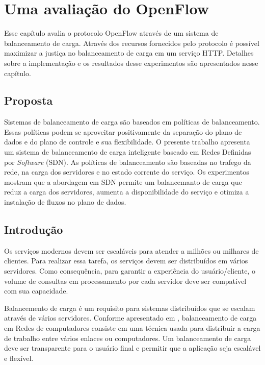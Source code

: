 \chapter{Uma avaliação do OpenFlow}

Esse capítulo avalia o protocolo OpenFlow através de um sistema de
balanceamento de carga.
Através dos recursos fornecidos pelo protocolo é possível maximizar a justiça
no balanceamento de carga em um serviço HTTP.
Detalhes sobre a implementação e os resultados desse experimentos são 
apresentados nesse capítulo.

\section{Proposta}

Sistemas de balanceamento de carga são baseados em políticas de balanceamento.
Essas políticas podem se aproveitar positivamente da separação do plano de 
dados e do plano de controle e sua flexibilidade.
O presente trabalho apresenta um sistema de balanceamento de carga inteligente
baseado em Redes Definidas por \emph{Software} (SDN).
As políticas de balanceamento são baseadas no trafego da rede, na carga dos 
servidores e no estado corrente do serviço.
Os experimentos mostram que a abordagem em SDN permite um balancemanto de carga
que reduz a carga dos servidores, aumenta a disponibilidade do serviço e 
otimiza a instalação de fluxos no plano de dados.

\section{Introdução}

Os serviços modernos devem ser escaláveis para atender a milhões ou milhares
de clientes.
Para realizar essa tarefa, os serviços devem ser distribuídos em vários
servidores. 
Como consequência, para garantir a experiência do usuário/cliente, o volume
de consultas em processamento por cada servidor deve ser compatível com 
sua capacidade.

Balancemento de carga é um requisito para sistemas distribuídos que se 
escalam através de vários servidores.
Conforme apresentado em \citep{hardeep2010openflow}, balanceamento de carga
em Redes de computadores consiste em uma técnica usada para distribuir a 
carga de trabalho entre vários enlaces ou computadores.
Um balanceamento de carga deve ser transparente para o usuário final e 
permitir que a aplicação seja escalável e flexível.

